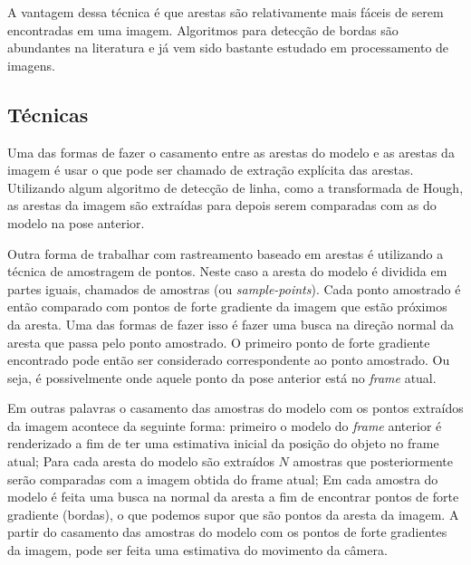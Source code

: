 A vantagem dessa técnica é que arestas são relativamente mais fáceis de serem encontradas em uma imagem. Algoritmos para detecção de bordas são abundantes na literatura e já vem sido bastante estudado em processamento de imagens.%

\subsection{Técnicas}

Uma das formas de fazer o casamento entre as arestas do modelo e as arestas da imagem é usar o que pode ser chamado de extração explícita das arestas. Utilizando algum algoritmo de detecção de linha, como a transformada de Hough, as arestas da imagem são extraídas para depois serem comparadas com as do modelo na pose anterior. %


Outra forma de trabalhar com rastreamento baseado em arestas é utilizando a técnica de amostragem de pontos. Neste caso a aresta do modelo é dividida em partes iguais, chamados de amostras (ou \emph{sample-points}). Cada ponto amostrado é então comparado com pontos de forte gradiente da imagem que estão próximos da aresta. Uma das formas de fazer isso é fazer uma busca na direção normal da aresta que passa pelo ponto amostrado. O primeiro ponto de forte gradiente encontrado pode então ser considerado correspondente ao ponto amostrado. Ou seja, é possivelmente onde aquele ponto da pose anterior está no \emph{frame} atual.


Em outras palavras o casamento das amostras do modelo com os pontos extraídos da imagem acontece da seguinte forma: primeiro o modelo do \emph{frame} anterior é renderizado a fim de ter uma estimativa inicial da posição do objeto no frame atual; Para cada aresta do modelo são extraídos $N$ amostras que posteriormente serão comparadas com a imagem obtida do frame atual; Em cada amostra do modelo é feita uma busca na normal da aresta a fim de encontrar pontos de forte gradiente (bordas), o que podemos supor que são pontos da aresta da imagem. A partir do casamento das amostras do modelo com os pontos de forte gradientes da imagem, pode ser feita uma estimativa do movimento da câmera.


